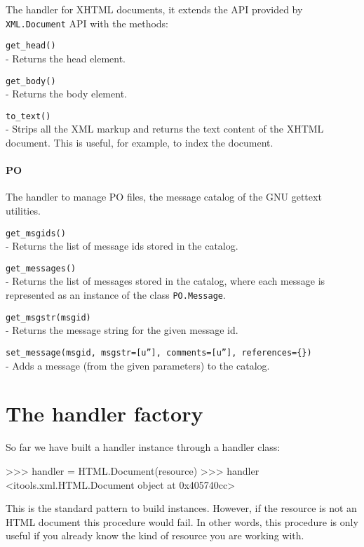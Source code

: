 The handler for XHTML documents, it extends the API provided by
{\tt XML.Document} API with the methods:

\begin{api}
  {\tt get\_head()}\\
  - Returns the head element.

  {\tt get\_body()}\\
  - Returns the body element.

  {\tt to\_text()}\\
  - Strips all the XML markup and returns the text content of the XHTML
    document. This is useful, for example, to index the document.
\end{api}

\paragraph{PO}

The handler to manage PO files, the message catalog of the GNU gettext
utilities.

\begin{api}
  {\tt get\_msgids()}\\
  - Returns the list of message ids stored in the catalog.

  {\tt get\_messages()}\\
  - Returns the list of messages stored in the catalog, where each message
    is represented as an instance of the class {\tt PO.Message}.

  {\tt get\_msgstr(msgid)}\\
  - Returns the message string for the given message id.

  {\tt set\_message(msgid, msgstr=[u''], comments=[u''], references=\{\})}\\
  - Adds a message (from the given parameters) to the catalog.
\end{api}


\section{The handler factory}

So far we have built a handler instance through a handler class:

\begin{code}
    >>> handler = HTML.Document(resource)
    >>> handler
    <itools.xml.HTML.Document object at 0x405740cc>
\end{code}

This is the standard pattern to build instances. However, if the resource
is not an HTML document this procedure would fail. In other words, this
procedure is only useful if you already know the kind of resource you
are working with.

